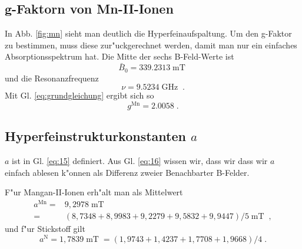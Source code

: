 \documentclass[a4paper,12pt]{article}
\begin{document}
\subsection{g-Faktorn von Mn-II-Ionen}
\label{sec:g_faktorn_von_mn_ii}

In Abb. \ref{fig:mn} sieht man deutlich die Hyperfeinaufspaltung. Um
den g-Faktor zu bestimmen, muss diese zur"uckgerechnet werden, damit
man nur ein einfaches Absorptionsspektrum hat. Die
Mitte der sechs B-Feld-Werte ist
\begin{equation*}
  \bar B_0  = 339.2313\operatorname{mT}
\end{equation*}
und die Resonanzfrequenz
\begin{equation*}
  \nu = 9.5234 \operatorname{GHz} \;.
\end{equation*}
Mit Gl. \eqref{eq:grundgleichung} ergibt sich so 
\begin{equation*}
	g^\text{Mn} = 2.0058 \;.
\end{equation*}





\subsection{Hyperfeinstrukturkonstanten $a$}
\label{sec:hyperfeinstrukturkonstanten}

$a$ ist in Gl. \eqref{eq:15} definiert. Aus Gl. \eqref{eq:16} wissen
wir, dass wir dass wir $a$ einfach ablesen k"onnen als Differenz
zweier Benachbarter B-Felder. 

F"ur Mangan-II-Ionen erh"alt man als Mittelwert
\begin{eqnarray*}
  a^\text{Mn} = &9,2978 \operatorname{mT} \\= &(8,7348
  +8,9983+9,2279+9,5832+9,9447)/5\operatorname{mT} \;,
\end{eqnarray*}
und f"ur Stickstoff gilt
\begin{equation*}
  a^\text{N} = 1,7839 \operatorname{mT} =
  (1,9743+1,4237+1,7708+1,9668)/4 \;.
\end{equation*}
\end{document}

